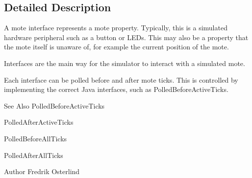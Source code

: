 \subsection{Detailed Description}
A mote interface represents a mote property. Typically, this is a simulated hardware peripheral such as a button or L\-E\-Ds. This may also be a property that the mote itself is unaware of, for example the current position of the mote.

Interfaces are the main way for the simulator to interact with a simulated mote.

Each interface can be polled before and after mote ticks. This is controlled by implementing the correct Java interfaces, such as Polled\-Before\-Active\-Ticks.

\begin{DoxySeeAlso}{See Also}
Polled\-Before\-Active\-Ticks 

Polled\-After\-Active\-Ticks 

Polled\-Before\-All\-Ticks 

Polled\-After\-All\-Ticks
\end{DoxySeeAlso}
\begin{DoxyAuthor}{Author}
Fredrik Osterlind 
\end{DoxyAuthor}


